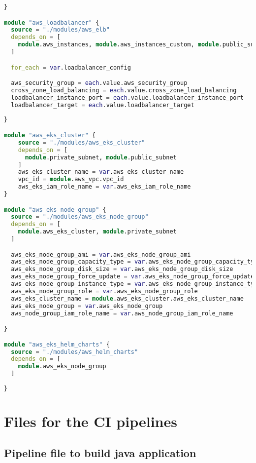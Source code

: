 \begin{lstlisting}[language=terraform]
}

module "aws_loadbalancer" {
  source = "./modules/aws_elb"
  depends_on = [
    module.aws_instances, module.aws_instances_custom, module.public_subnet, module.aws_security_groups
  ]

  for_each = var.loadbalancer_config

  aws_security_group = each.value.aws_security_group
  cross_zone_load_balancing = each.value.cross_zone_load_balancing
  loadbalancer_instance_port = each.value.loadbalancer_instance_port
  loadbalancer_target = each.value.loadbalancer_target
  
}

module "aws_eks_cluster" {
    source = "./modules/aws_eks_cluster"
    depends_on = [
      module.private_subnet, module.public_subnet
    ]
    aws_eks_cluster_name = var.aws_eks_cluster_name
    vpc_id = module.aws_vpc.vpc_id
    aws_eks_iam_role_name = var.aws_eks_iam_role_name   
}

module "aws_eks_node_group" {
  source = "./modules/aws_eks_node_group"
  depends_on = [
    module.aws_eks_cluster, module.private_subnet
  ]

  aws_eks_node_group_ami = var.aws_eks_node_group_ami
  aws_eks_node_group_capacity_type = var.aws_eks_node_group_capacity_type
  aws_eks_node_group_disk_size = var.aws_eks_node_group_disk_size
  aws_eks_node_group_force_update = var.aws_eks_node_group_force_update
  aws_eks_node_group_instance_type = var.aws_eks_node_group_instance_type
  aws_eks_node_group_role = var.aws_eks_node_group_role
  aws_eks_cluster_name = module.aws_eks_cluster.aws_eks_cluster_name
  aws_eks_node_group = var.aws_eks_node_group
  aws_node_group_iam_role_name = var.aws_node_group_iam_role_name

}

module "aws_eks_helm_charts" {
  source = "./modules/aws_helm_charts"
  depends_on = [
    module.aws_eks_node_group
  ]
  
}
\end{lstlisting}

\section{
{Files for the CI pipelines}}
\label{sec:Bestanden voor de CI pipelines}

\subsection{
{Pipeline file to build java application}}
\label{sec:Pipeline bestand voor het bouwen van de java applicatie}

